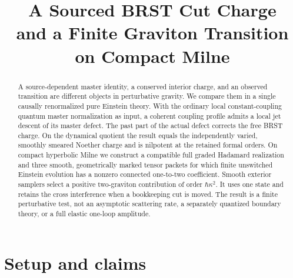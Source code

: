 \documentclass[11pt]{article}
\title{A Sourced BRST Cut Charge\\and a Finite Graviton Transition on Compact Milne}
\author{}
\date{}
\theoremstyle{remark}
\begin{document}
\maketitle

\begin{abstract}
A source-dependent master identity, a conserved interior charge, and an observed transition are different objects in perturbative gravity. We compare them in a single causally renormalized pure Einstein theory. With the ordinary local constant-coupling quantum master normalization as input, a coherent coupling profile admits a local jet descent of its master defect. The past part of the actual defect corrects the free BRST charge. On the dynamical quotient the result equals the independently varied, smoothly smeared Noether charge and is nilpotent at the retained formal orders. On compact hyperbolic Milne we construct a compatible full graded Hadamard realization and three smooth, geometrically marked tensor packets for which finite unswitched Einstein evolution has a nonzero connected one-to-two coefficient. Smooth exterior samplers select a positive two-graviton contribution of order \(\hbar\kappa^2\). It uses one state and retains the cross interference when a bookkeeping cut is moved. The result is a finite perturbative test, not an asymptotic scattering rate, a separately quantized boundary theory, or a full elastic one-loop amplitude.
\end{abstract}

\section{Setup and claims}\label{sec:setup}
\end{document}
